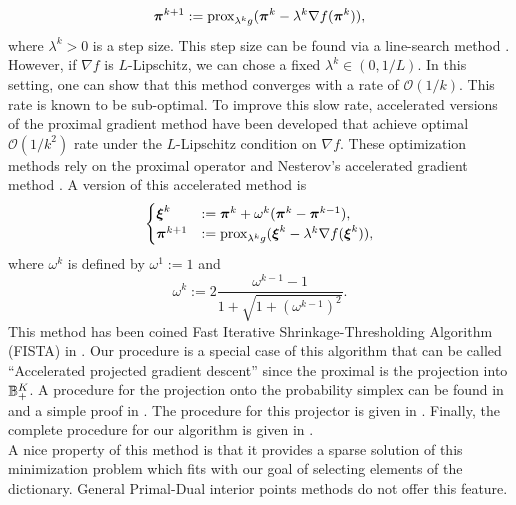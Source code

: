 \begin{equation}
    \boldsymbol \pi^{k+1} := \textnormal{prox}_{\lambda^k g}(\boldsymbol \pi^k-\lambda^k\nabla f(\boldsymbol \pi^k)),
\end{equation}
where $\lambda^k > 0$ is a step size. This step size can be found via a line-search method \citep{Parikh:2014:PA:2693612.2693613}. However, if $\nabla f$ is $L$-Lipschitz, we can chose a fixed $\lambda^k\in (0,1/L)$. In this setting, one can show that this method converges with a rate of $\mathcal O(1/k)$. This rate is known to be sub-optimal. To improve this slow rate, accelerated versions of the proximal gradient method have been developed \citep{RePEc:cor:louvco:2007076,Beck:2009:FIS:1658360.1658364} that achieve optimal $\mathcal O(1/k^2)$ rate under the $L$-Lipschitz condition on $\nabla f$. These optimization methods rely on the proximal operator and Nesterov's accelerated gradient method \citep{Nesterov:1983wy}. A version of this accelerated method is
\begin{equation*}
    \begin{cases}
    \boldsymbol \xi^k &:= \boldsymbol \pi^k + \omega^k(\boldsymbol \pi^k-\boldsymbol \pi^{k-1}),\\
    \boldsymbol \pi^{k+1} &:= \textnormal{prox}_{\lambda^k g}(\boldsymbol \xi^k-\lambda^k\nabla f(\boldsymbol \xi^k)),
    \end{cases}
\end{equation*}
where $\omega^k$ is defined by $\omega^1 := 1$ and
\begin{equation*}
    \omega^k := 2\frac{\omega^{k-1}-1}{1+\sqrt{1+(\omega^{k-1})^2}}.
\end{equation*}
This method has been coined Fast Iterative Shrinkage-Thresholding Algorithm (FISTA) in \citep{Beck:2009:FIS:1658360.1658364}. Our procedure is a special case of this algorithm that can be called ``Accelerated projected gradient descent'' since the proximal is the projection into ${\mathbb B}_+^K$. A procedure for the projection onto the probability simplex can be found in \citep{Duchi:2008:EPL:1390156.1390191} and a simple proof in \citep{Wang13projectiononto}. The procedure for this projector is given in . Finally, the complete procedure for our algorithm is given in .\\ 
A nice property of this method is that it provides a sparse solution of this minimization problem which fits with our goal of selecting elements of the dictionary. General Primal-Dual interior points methods do not offer this feature.

